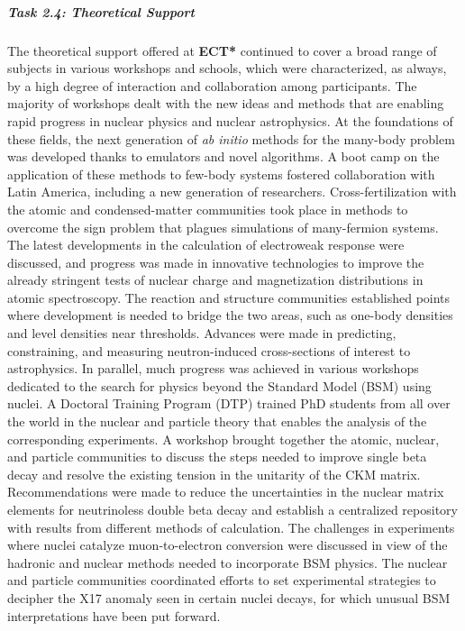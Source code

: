 \subparagraph{Task 2.4: Theoretical Support} \mbox{}

The theoretical support offered at \textbf{ECT*} continued to cover a broad range of subjects in various workshops and schools, which were characterized, as always, by a high degree of interaction and collaboration among participants. The majority of workshops dealt with the new ideas and methods that are enabling rapid progress in nuclear physics and nuclear astrophysics. At the foundations of these fields, the next generation of {\it ab initio} methods for the many-body problem was developed thanks to emulators and novel algorithms. A boot camp on the application of these methods to few-body systems fostered collaboration with Latin America, including a new generation of researchers. Cross-fertilization with the atomic and condensed-matter communities took place in methods to overcome the sign problem that plagues simulations of many-fermion systems. The latest developments in the calculation of electroweak response were discussed, and progress was made in innovative technologies to improve the already stringent tests of nuclear charge and magnetization distributions in atomic spectroscopy. The reaction and structure communities established points where development is needed to bridge the two areas, such as one-body densities and level densities near thresholds. Advances were made in predicting, constraining, and measuring neutron-induced cross-sections of interest to astrophysics. In parallel, much progress was achieved in various workshops dedicated to the search for physics beyond the Standard Model (BSM) using nuclei. A Doctoral Training Program (DTP) trained PhD students from all over the world in the nuclear and particle theory that enables the analysis of the corresponding experiments. A workshop brought together the atomic, nuclear, and particle communities to discuss the steps needed to improve single beta decay and resolve the existing tension in the unitarity of the CKM matrix. Recommendations were made to reduce the uncertainties in the nuclear matrix elements for neutrinoless double beta decay and establish a centralized repository with results from different methods of calculation. The challenges in experiments where nuclei catalyze muon-to-electron conversion were discussed in view of the hadronic and nuclear methods needed to incorporate BSM physics. The nuclear and particle communities coordinated efforts to set experimental strategies to decipher the X17 anomaly seen in certain nuclei decays, for which unusual BSM interpretations have been put forward. 
